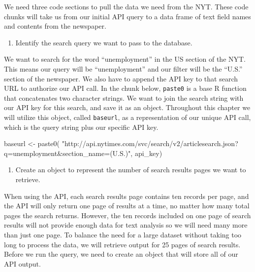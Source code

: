 \documentclass[
  krantz2]{krantz}
\makeatletter
\newenvironment{Shaded}{\begin{snugshade}}{\end{snugshade}}
\newcommand{\FunctionTok}[1]{\textcolor[rgb]{0,0,0}{#1}}
\newcommand{\NormalTok}[1]{#1}
\newcommand{\OtherTok}[1]{\textcolor[rgb]{0.37,0.37,0.37}{#1}}
\newcommand{\StringTok}[1]{\textcolor[rgb]{0.5,0.5,0.5}{#1}}
\providecommand{\tightlist}{%
  \setlength{\itemsep}{0pt}\setlength{\parskip}{0pt}}
\newenvironment{kframe}{%
\medskip{}
\setlength{\fboxsep}{.8em}
 \def\at@end@of@kframe{}%
 \ifinner\ifhmode%
  \def\at@end@of@kframe{\end{minipage}}%
  \begin{minipage}{\columnwidth}%
 \fi\fi%
 \def\FrameCommand##1{\hskip\@totalleftmargin \hskip-\fboxsep
 \colorbox{shadecolor}{##1}\hskip-\fboxsep
     \hskip-\linewidth \hskip-\@totalleftmargin \hskip\columnwidth}%
 \MakeFramed {\advance\hsize-\width
   \@totalleftmargin\z@ \linewidth\hsize
   \@setminipage}}%
 {\par\unskip\endMakeFramed%
 \at@end@of@kframe}
\renewenvironment{Shaded}{\begin{kframe}}{\end{kframe}}
\makeatother
\begin{document}
We need three code sections to pull the data we need from the NYT. These code chunks will take us from our initial API query to a data frame of text field names and contents from the newspaper.

\begin{enumerate}
\def\labelenumi{\arabic{enumi}.}
\tightlist
\item
  Identify the search query we want to pass to the database.
\end{enumerate}

We want to search for the word ``unemployment'' in the US section of the NYT. This means our query will be ``unemployment'' and our filter will be the ``U.S.'' section of the newspaper. We also have to append the API key to that search URL to authorize our API call. In the chunk below, \texttt{paste0} is a base R function that concatenates two character strings. We want to join the search string with our API key for this search, and save it as an object. Throughout this chapter we will utilize this object, called \texttt{baseurl}, as a representation of our unique API call, which is the query string plus our specific API key.

\begin{Shaded}
\begin{Highlighting}[]
\NormalTok{baseurl }\OtherTok{\textless{}{-}} \FunctionTok{paste0}\NormalTok{(}
  \StringTok{"http://api.nytimes.com/svc/search/v2/articlesearch.json?q=unemployment\&section\_name=(U.S.)"}\NormalTok{,}
\NormalTok{  api\_key)}
\end{Highlighting}
\end{Shaded}

\begin{enumerate}
\def\labelenumi{\arabic{enumi}.}
\setcounter{enumi}{1}
\tightlist
\item
  Create an object to represent the number of search results pages we want to retrieve.
\end{enumerate}

When using the API, each search results page contains ten records per page, and the API will only return one page of results at a time, no matter how many total pages the search returns. However, the ten records included on one page of search results will not provide enough data for text analysis so we will need many more than just one page. To balance the need for a large dataset without taking too long to process the data, we will retrieve output for 25 pages of search results. Before we run the query, we need to create an object that will store all of our API output.
\end{document}
